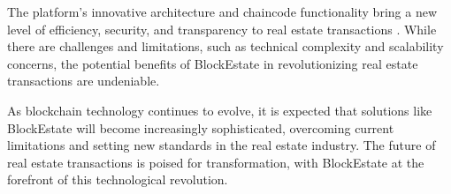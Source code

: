 \documentclass[3p,times]{elsarticle}
\begin{document}
The platform's innovative architecture and chaincode functionality bring a new level of efficiency, security, and transparency to real estate transactions \cite{shuaib2021improving}. While there are challenges and limitations, such as technical complexity and scalability concerns, the potential benefits of BlockEstate in revolutionizing real estate transactions are undeniable.

As blockchain technology continues to evolve, it is expected that solutions like BlockEstate will become increasingly sophisticated, overcoming current limitations and setting new standards in the real estate industry. The future of real estate transactions is poised for transformation, with BlockEstate at the forefront of this technological revolution.





\end{document}
